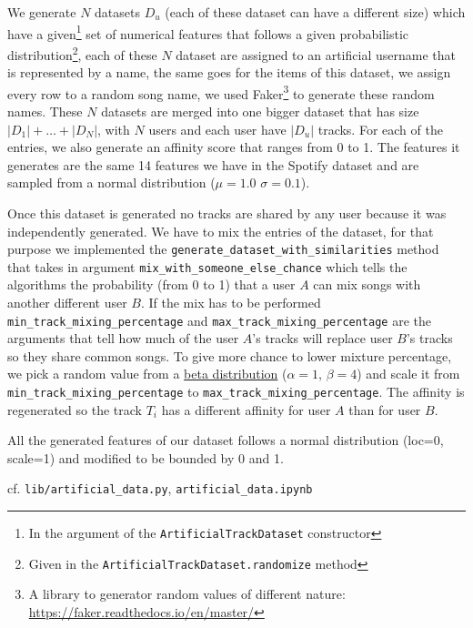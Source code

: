We generate $N$ datasets $D_u$ (each of these dataset can have a different size) which have a given\footnote{In the argument of the \texttt{ArtificialTrackDataset} constructor} set of numerical features that follows a given probabilistic distribution\footnote{Given in the \texttt{ArtificialTrackDataset.randomize} method}, each of these $N$ dataset are assigned to an artificial username that is represented by a name, the same goes for the items of this dataset, we assign every row to a random song name, we used Faker\footnote{A library to generator random values of different nature: \url{https://faker.readthedocs.io/en/master/}} to generate these random names. These $N$ datasets are merged into one bigger dataset that has size $|D_1| + \dots + |D_N|$, with $N$ users and each user have $|D_u|$ tracks. For each of the entries, we also generate an affinity score that ranges from 0 to 1. The features it generates are the same 14 features we have in the Spotify dataset and are sampled from a normal distribution ($\mu = 1.0$ $\sigma=0.1$).


Once this dataset is generated no tracks are shared by any user because it was independently generated. We have to mix the entries of the dataset, for that purpose we implemented the \texttt{generate\_dataset\_with\_similarities} method that takes in argument \texttt{mix\_with\_someone\_else\_chance} which tells the algorithms the probability (from 0 to 1) that a user $A$ can mix songs with another different user $B$. If the mix has to be performed \texttt{min\_track\_mixing\_percentage} and \texttt{max\_track\_mixing\_percentage} are the arguments that tell how much of the user $A$'s tracks will replace user $B$'s tracks so they share common songs. To give more chance to lower mixture percentage, we pick a random value from a \href{https://en.wikipedia.org/wiki/Beta_distribution}{beta distribution} ($\alpha = 1$, $\beta = 4$) and scale it from \texttt{min\_track\_mixing\_percentage} to \texttt{max\_track\_mixing\_percentage}. The affinity is regenerated so the track $T_i$ has a different affinity for user $A$ than for user $B$.

All the generated features of our dataset follows a normal distribution (loc=0, scale=1) and modified to be bounded by 0 and 1.

cf. \texttt{lib/artificial\_data.py}, \texttt{artificial\_data.ipynb}

